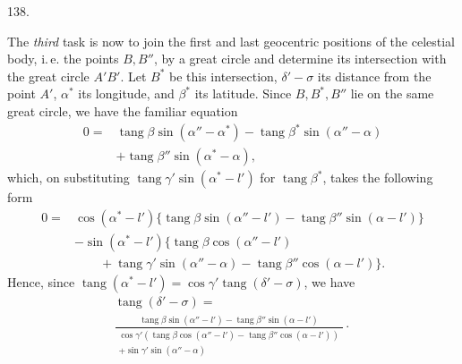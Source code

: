 \par{}\medskip
\begin{center}\hypertarget{native-185-article138}{}138.\end{center}
The \emph{third} task is now to join the first and last geocentric positions of the celestial
body, i.\,e. the points $B,B''$, by a great circle and determine its intersection with the great
circle $A'B'$. Let $B^*$ be this intersection, $\delta'-\sigma$ its distance from the point $A'$, $\alpha^*$ its
longitude, and $\beta^*$ its latitude. Since $B,B^*,B''$ lie on the same great circle, we have the
familiar equation
\[
\begin{aligned}
0={}&\operatorname{tang}\beta\sin(\alpha''-\alpha^*)-\operatorname{tang}\beta^*\sin(\alpha''-\alpha)\\
&+\operatorname{tang}\beta''\sin(\alpha^*-\alpha),
\end{aligned}
\]
which, on substituting $\operatorname{tang}\gamma'\sin(\alpha^*-l')$ for $\operatorname{tang}\beta^*$, takes the following form
\[
\begin{aligned}
0={}&\cos(\alpha^*-l')\{\operatorname{tang}\beta\sin(\alpha''-l')-\operatorname{tang}\beta''\sin(\alpha-l')\}\\
&-\sin(\alpha^*-l')\{\operatorname{tang}\beta\cos(\alpha''-l')\\
&\qquad+\operatorname{tang}\gamma'\sin(\alpha''-\alpha)-\operatorname{tang}\beta''\cos(\alpha-l')\}.
\end{aligned}
\]
Hence, since $\operatorname{tang}(\alpha^*-l')=\cos\gamma'\operatorname{tang}(\delta'-\sigma)$, we have
\[
\begin{gathered}
\operatorname{tang}(\delta'-\sigma)=\\[.4ex]
\frac{\operatorname{tang}\beta\sin(\alpha''-l')-\operatorname{tang}\beta''\sin(\alpha-l')}{\begin{gathered}\cos\gamma'(\operatorname{tang}\beta\cos(\alpha''-l')-\operatorname{tang}\beta''\cos(\alpha-l'))\\+\sin\gamma'\sin(\alpha''-\alpha)\end{gathered}}\mathpunct{\cdot}
\end{gathered}
\]

